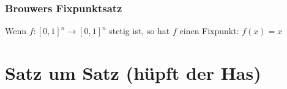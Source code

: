 \documentclass[a4paper,twoside,DIV15,BCOR12mm]{scrbook}
\begin{document}
\subsection{Brouwers Fixpunktsatz}
\begin{satz}
Wenn $f:[0,1]^n \to [0,1]^n$ stetig ist, so hat $f$ einen Fixpunkt: $f(x) = x$
\end{satz}


\chapter{Satz um Satz (hüpft der Has)}

\renewcommand{\indexname}{Stichwortverzeichnis}
\addtocounter{chapter}{1}
\printindex
\end{document}
